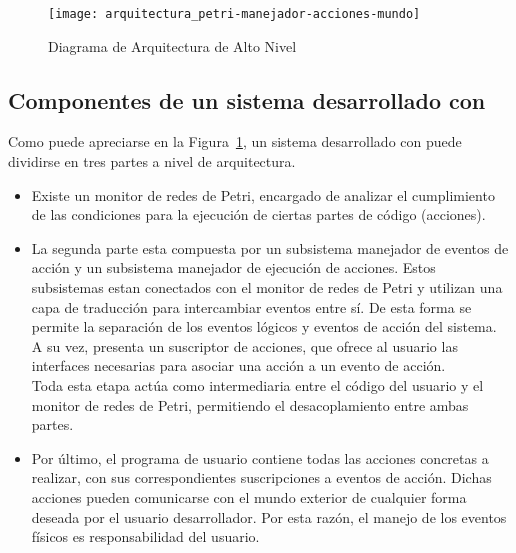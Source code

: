 \begin{figure}[h]
	\centering
	\texttt{[image: arquitectura\_petri-manejador-acciones-mundo]}
	\caption{Diagrama de Arquitectura de Alto Nivel}
	\label{fig:arquitectura_petri-manejador-acciones-mundo}
\end{figure}

\subsection{Componentes de un sistema desarrollado con \nombreFramework}
Como puede apreciarse en la
Figura~\ref{fig:arquitectura_petri-manejador-acciones-mundo}, un sistema
desarrollado con \nombreFramework puede dividirse en tres partes a nivel de arquitectura.
\begin{itemize}
\item Existe un monitor de redes de Petri, encargado de analizar el
cumplimiento de las condiciones para la ejecución de ciertas partes de código
(acciones). 
\item La segunda parte esta compuesta por un subsistema manejador de eventos de
acción y un subsistema manejador de ejecución de acciones. Estos subsistemas
estan conectados con el monitor de redes de Petri y utilizan una capa de
traducción para intercambiar eventos entre sí. De esta forma se permite la
separación de los eventos lógicos y eventos de acción del sistema.\\
A su vez, presenta un suscriptor de acciones, que ofrece al usuario las
interfaces necesarias para asociar una acción a un evento de acción.\\
Toda esta etapa actúa como intermediaria entre el
código del usuario y el monitor de redes de Petri, permitiendo
el desacoplamiento entre ambas partes.
\item Por último, el programa de usuario contiene todas las acciones
concretas a realizar, con sus correspondientes suscripciones a eventos
de acción. Dichas acciones pueden comunicarse con el mundo exterior de
cualquier forma deseada por el usuario desarrollador. Por esta razón, el manejo
de los eventos físicos es responsabilidad del usuario.
\end{itemize}


